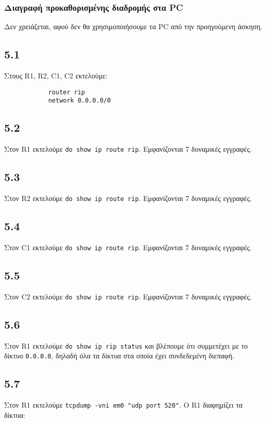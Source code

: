 \documentclass[a4paper, 12pt]{article}
\begin{document}
		\subsubsection*{Διαγραφή προκαθορισμένης διαδρομής στα PC}
			Δεν χρειάζεται, αφού δεν θα χρησιμοποιήσουμε τα PC από την προηγούμενη άσκηση.
			
	\subsection*{5.1}
		Στους R1, R2, C1, C2 εκτελούμε:
		
		\begin{verbatim}
			router rip
			network 0.0.0.0/0
		\end{verbatim}

	\subsection*{5.2}
		Στον R1 εκτελούμε \verb|do show ip route rip|. Εμφανίζονται 7 δυναμικές εγγραφές.

	\subsection*{5.3}
		Στον R2 εκτελούμε \verb|do show ip route rip|. Εμφανίζονται 7 δυναμικές εγγραφές.
		

	\subsection*{5.4}
		Στον C1 εκτελούμε \verb|do show ip route rip|. Εμφανίζονται 7 δυναμικές εγγραφές.
		

	\subsection*{5.5}
		Στον C2 εκτελούμε \verb|do show ip route rip|. Εμφανίζονται 7 δυναμικές εγγραφές.
		

	\subsection*{5.6}
		Στον R1 εκτελούμε \verb|do show ip rip status| και βλέπουμε ότι συμμετέχει με το δίκτυο \verb|0.0.0.0|, δηλαδή όλα τα δίκτυα στα οποία έχει συνδεδεμένη διεπαφή. 

	\subsection*{5.7}
		Στον R1 εκτελούμε \verb|tcpdump -vni em0 "udp port 520"|. Ο R1 διαφημίζει τα δίκτυα:
		
\end{document}
